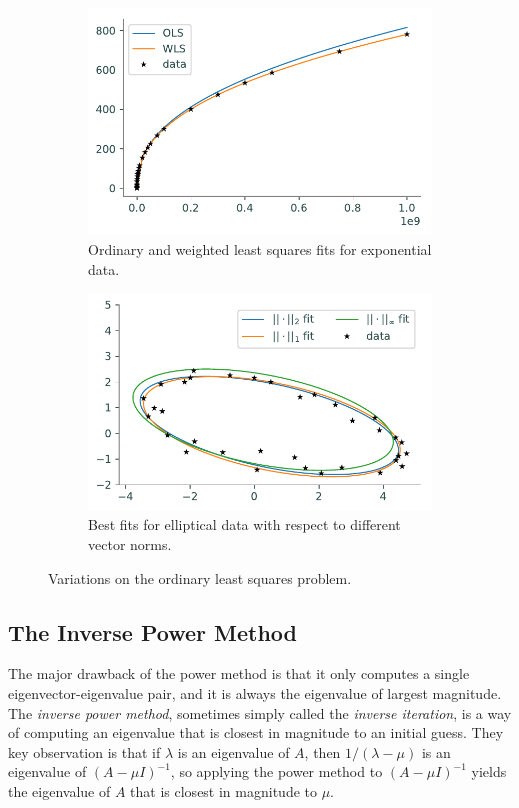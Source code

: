 \begin{figure}[H] %
\captionsetup[subfigure]{justification=centering}
\centering
\begin{subfigure}{.49\textwidth}
    \centering
    \includegraphics[width=.7\textwidth]{figures/weighted_least_squares.pdf}
    \caption{Ordinary and weighted least squares fits for exponential data.}
    \label{fig:lstsq-ols-vs-wls}
\end{subfigure}
%
\begin{subfigure}{.49\textwidth}
    \centering
    \includegraphics[width=.7\textwidth]{figures/various_norm_ellipse.pdf}
    \caption{Best fits for elliptical data with respect to different vector norms.}
    \label{fig:lstsq-different-norms}
\end{subfigure}
\caption{Variations on the ordinary least squares problem.}
\end{figure}

\subsection*{The Inverse Power Method} %

The major drawback of the power method is that it only computes a single eigenvector-eigenvalue pair, and it is always the eigenvalue of largest magnitude.
The \emph{inverse power method}, sometimes simply called the \emph{inverse iteration}, is a way of computing an eigenvalue that is closest in magnitude to an initial guess.
They key observation is that if $\lambda$ is an eigenvalue of $A$, then $1/(\lambda - \mu)$ is an eigenvalue of $(A - \mu I)^{-1}$, so applying the power method to $(A - \mu I)^{-1}$ yields the eigenvalue of $A$ that is closest in magnitude to $\mu$.

